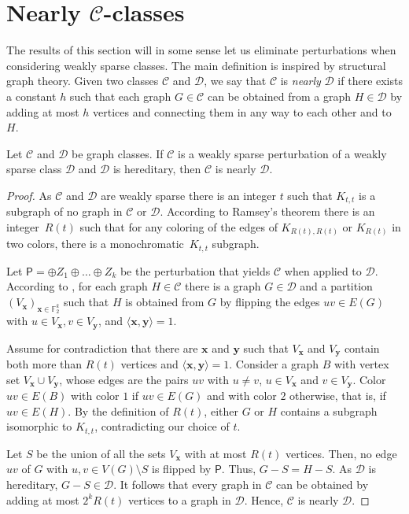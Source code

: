 \documentclass{lmcs}
\newcommand{\Cc}{\mathscr{C}}
\newcommand{\Dd}{\mathscr{D}}
\theoremstyle{definition}
\begin{document}
\section{Nearly $\Cc$-classes}

The results of this section will in some sense let us eliminate perturbations when considering weakly sparse classes. The main definition is inspired by structural graph theory.
Given two classes $\Cc$ and $\Dd$, we say that $\Cc$ is \emph{nearly} $\Dd$ if there exists a constant $h$ such that each graph $G \in \Cc$ can be obtained from a graph $H \in \Dd$ by adding at most $h$ vertices and connecting them in any way to each other and to $H$.

\begin{lem}
	\label{lem:perws}
	Let $\Cc$ and $\Dd$ be graph classes. If $\Cc$ is a weakly sparse perturbation of a weakly sparse class $\Dd$ and $\Dd$ is hereditary, then $\Cc$ is nearly $\Dd$.
\end{lem}
\begin{proof}
	As $\Cc$ and $\Dd$ are weakly sparse there is an integer $t$ such that $K_{t,t}$ is a subgraph of no graph in $\Cc$ or $\Dd$. According to Ramsey's theorem \cite[Theorem 9.1.]{diestel2012graph} there is an integer~$R(t)$ such that for any coloring of the edges of $K_{R(t),R(t)}$ or $K_{R(t)}$ in two colors, there is a monochromatic~$K_{t,t}$ subgraph.
	
	Let $\mathsf P=\oplus Z_1\oplus\dots\oplus Z_k$ be the perturbation that yields $\Cc$ when applied to $\Dd$.
	According to , for each graph $H\in\Cc$ there is a graph $G\in\Dd$ and a partition $(V_{\mathbf x})_{\mathbf x\in\mathbb{F}_2^k}$ such that $H$ is obtained from $G$ by flipping the edges $uv\in E(G)$ with 
	$u\in V_{\mathbf x}, v\in V_{\mathbf y}$, and $\langle\mathbf{x},\mathbf{y}\rangle=1$.
	
	Assume for contradiction that there are $\mathbf x$ and $\mathbf y$ such that $V_{\mathbf x}$ and $V_{\mathbf y}$ contain both more than $R(t)$ vertices and $\langle\mathbf{x},\mathbf{y}\rangle=1$.
	Consider a graph $B$ with vertex set $V_{\mathbf x}\cup V_{\mathbf y}$, whose edges are the pairs $uv$ with $u\neq v$, $u\in V_{\mathbf x}$ and $v\in V_{\mathbf y}$. Color $uv\in E(B)$ with color $1$ if $uv\in E(G)$ and with color $2$ otherwise, that is, if $uv\in E(H)$.
	By the definition of $R(t)$, either $G$ or $H$ contains a subgraph isomorphic to $K_{t,t}$, contradicting our choice of $t$.
	
	Let $S$ be the union of all the sets $V_{\mathbf x}$ with at most $R(t)$ vertices. Then, no edge $uv$ of $G$ with $u,v\in V(G)\setminus S$ is flipped by $\mathsf P$. Thus, $G-S=H-S$. 
	As $\Dd$ is hereditary, $G-S\in\Dd$. 
	It follows that every graph in $\Cc$ can be obtained by adding at most $2^kR(t)$ vertices to a graph in $\Dd$. Hence, $\Cc$ is nearly $\Dd$.
\end{proof}
\end{document}
